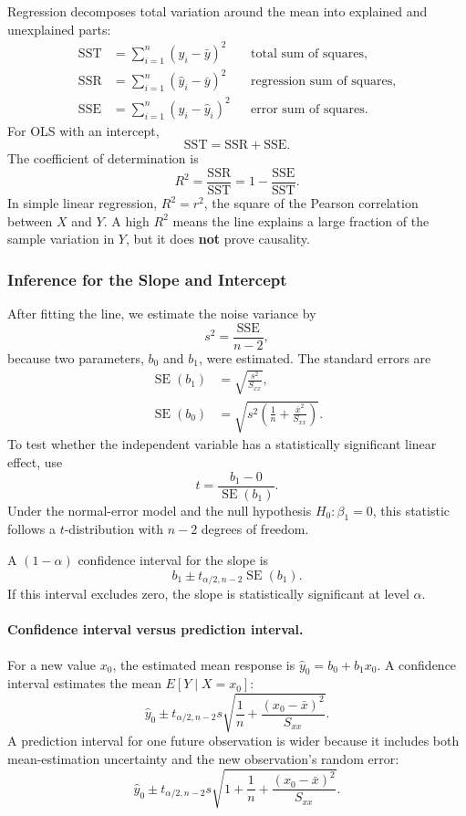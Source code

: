 \documentclass[12pt,openany]{book}
\begin{document}
Regression decomposes total variation around the mean into explained and unexplained parts:
\begin{align*}
\text{SST} &= \sum_{i=1}^{n}(y_i-\bar{y})^2 &&\text{total sum of squares},\\
\text{SSR} &= \sum_{i=1}^{n}(\hat{y}_i-\bar{y})^2 &&\text{regression sum of squares},\\
\text{SSE} &= \sum_{i=1}^{n}(y_i-\hat{y}_i)^2 &&\text{error sum of squares}.
\end{align*}
For OLS with an intercept,
\[
\text{SST}=\text{SSR}+\text{SSE}.
\]
The coefficient of determination is
\[
R^2=\frac{\text{SSR}}{\text{SST}}=1-\frac{\text{SSE}}{\text{SST}}.
\]
In simple linear regression, \(R^2=r^2\), the square of the Pearson correlation between \(X\) and \(Y\). A high \(R^2\) means the line explains a large fraction of the sample variation in \(Y\), but it does \textbf{not} prove causality.

\subsubsection{Inference for the Slope and Intercept}

After fitting the line, we estimate the noise variance by
\[
s^2=\frac{\text{SSE}}{n-2},
\]
because two parameters, \(b_0\) and \(b_1\), were estimated. The standard errors are
\begin{align*}
\operatorname{SE}(b_1)&=\sqrt{\frac{s^2}{S_{xx}}},\\
\operatorname{SE}(b_0)&=\sqrt{s^2\left(\frac{1}{n}+\frac{\bar{x}^2}{S_{xx}}\right)}.
\end{align*}
To test whether the independent variable has a statistically significant linear effect, use
\[
t=\frac{b_1-0}{\operatorname{SE}(b_1)}.
\]
Under the normal-error model and the null hypothesis \(H_0:\beta_1=0\), this statistic follows a \(t\)-distribution with \(n-2\) degrees of freedom.

A \((1-\alpha)\) confidence interval for the slope is
\[
b_1\pm t_{\alpha/2,n-2}\operatorname{SE}(b_1).
\]
If this interval excludes zero, the slope is statistically significant at level \(\alpha\).

\paragraph{Confidence interval versus prediction interval.}
For a new value \(x_0\), the estimated mean response is \(\hat{y}_0=b_0+b_1x_0\). A confidence interval estimates the mean \(E[Y\mid X=x_0]\):
\[
\hat{y}_0\pm t_{\alpha/2,n-2}s\sqrt{\frac{1}{n}+\frac{(x_0-\bar{x})^2}{S_{xx}}}.
\]
A prediction interval for one future observation is wider because it includes both mean-estimation uncertainty and the new observation's random error:
\[
\hat{y}_0\pm t_{\alpha/2,n-2}s\sqrt{1+\frac{1}{n}+\frac{(x_0-\bar{x})^2}{S_{xx}}}.
\]
\end{document}
